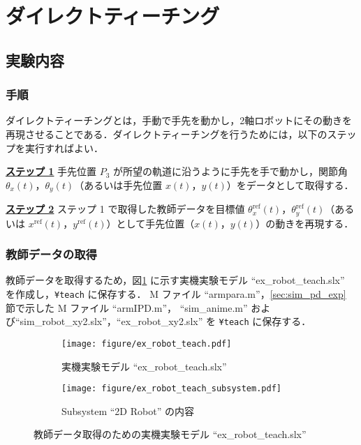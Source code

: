 \section{ダイレクトティーチング}
\label{sec:direct_teaching}

\subsection{実験内容}
\subsubsection{手順}
ダイレクトティーチングとは，手動で手先を動かし，2軸ロボットにその動きを再現させることである．ダイレクトティーチングを行うためには，以下のステップを実行すればよい．

\underline{\textbf{ステップ 1}}\quad 
手先位置 $P_3$ が所望の軌道に沿うように手先を手で動かし，関節角 $\theta_x(t)$，$\theta_y(t)$（あるいは手先位置 $x(t)$，$y(t)$）をデータとして取得する．

\underline{\textbf{ステップ 2}}\quad 
ステップ 1 で取得した教師データを目標値 $\theta_x^{\mathrm{ref}}(t)$，$\theta_y^{\mathrm{ref}}(t)$（あるいは $x^{\mathrm{ref}}(t)$，$y^{\mathrm{ref}}(t)$）として手先位置（$x(t)$，$y(t)$）の動きを再現する．

\subsubsection{教師データの取得}
教師データを取得するため，図\ref{fig:ex_robot_teach} に示す実機実験モデル ``ex\_robot\_teach.slx'' を作成し，\verb|¥teach| に保存する． M ファイル ``armpara.m''，\ref{sec:sim_pd_exp} 節で示した M ファイル ``armIPD.m''， ``sim\_anime.m'' および``sim\_robot\_xy2.slx''，``ex\_robot\_xy2.slx'' を \verb|¥teach| に保存する．

\begin{figure}[H]
    \centering
    \begin{subfigure}[b]{0.48\linewidth}
        \centering
        \texttt{[image: figure/ex\_robot\_teach.pdf]}
        \caption{実機実験モデル ``ex\_robot\_teach.slx''}
    \end{subfigure}
    \begin{subfigure}[b]{0.48\linewidth}
        \centering
        \texttt{[image: figure/ex\_robot\_teach\_subsystem.pdf]}
        \caption{Subsystem ``2D Robot'' の内容}
    \end{subfigure}
    \caption{教師データ取得のための実機実験モデル ``ex\_robot\_teach.slx''}
    \label{fig:ex_robot_teach}
\end{figure}

